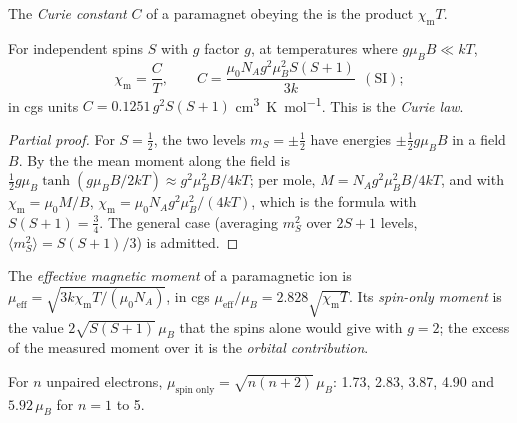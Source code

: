 \begin{definition}\label{def:b3:complex-spectra-magnetism:curie}
The \emph{Curie constant} $C$ of a paramagnet obeying the
 is the product $\chi_{\mathrm m}T$.
\end{definition}

\begin{theorem}\label{thm:b3:complex-spectra-magnetism:curie}
For independent spins $S$ with $g$ factor $g$, at temperatures where $g\mu_BB \ll kT$,
\[
  \chi_{\mathrm m} = \frac{C}{T}, \qquad C = \frac{\mu_0N_Ag^2\mu_B^2S(S+1)}{3k}\ \ (\text{SI});
\]
in cgs units $C = 0.1251\,g^2S(S+1)$ \unit{cm^3.K.mol^{-1}}. This is the \emph{Curie law}.
\end{theorem}

\begin{proof}[Partial proof]
For $S = \frac12$, the two levels $m_S = \pm\frac12$ have energies $\pm\frac12g\mu_BB$ in a field $B$. By the
 the mean moment along the field is $\frac12g\mu_B\tanh(g\mu_BB/2kT) \approx
g^2\mu_B^2B/4kT$; per mole, $M = N_Ag^2\mu_B^2B/4kT$, and with $\chi_{\mathrm m} = \mu_0M/B$, $\chi_{\mathrm m} = \mu_0N_Ag^2\mu_B^2/(4kT)$,
which is the formula with $S(S+1) = \frac34$. The general case (averaging $m_S^2$ over $2S + 1$
levels, $\langle m_S^2\rangle = S(S+1)/3$) is admitted.
\end{proof}

\begin{definition}\label{def:b3:complex-spectra-magnetism:moment}
The \emph{effective magnetic moment} of a
paramagnetic ion is $\mu_{\mathrm{eff}} = \sqrt{3k\chi_{\mathrm m}T/(\mu_0N_A)}$, in cgs $\mu_{\mathrm{eff}}/\mu_B = 2.828\sqrt{\chi_{\mathrm m}T}$. Its
\emph{spin-only moment} is the value $2\sqrt{S(S+1)}\,\mu_B$ that the
spins alone would give with $g = 2$; the excess of the measured moment over it is
the \emph{orbital contribution}.
\end{definition}

\begin{proposition}\label{prop:b3:complex-spectra-magnetism:spin-only}
For $n$ unpaired electrons, $\mu_{\text{spin only}} = \sqrt{n(n+2)}\,\mu_B$: 1.73, 2.83, 3.87, 4.90 and $5.92\,\mu_B$ for
$n = 1$ to 5.
\end{proposition}

